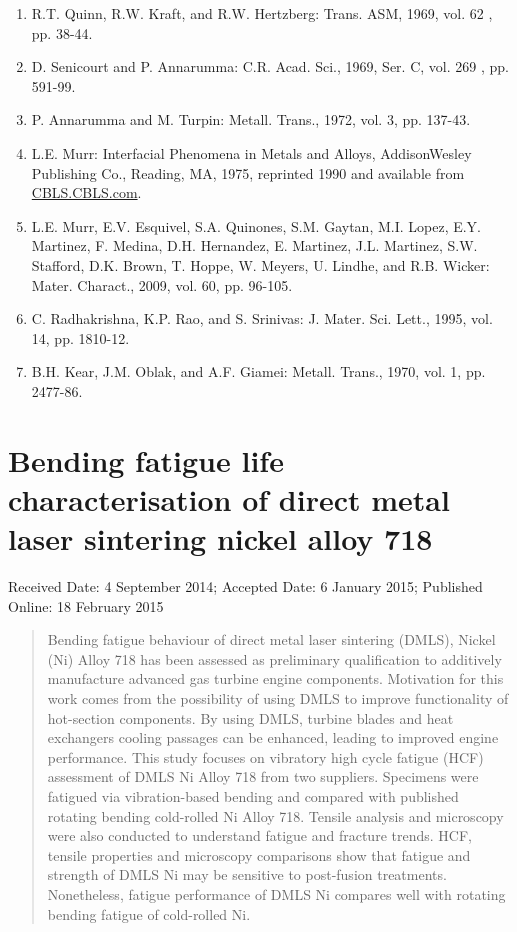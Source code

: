 \documentclass[10pt]{article}
\begin{document}
\begin{enumerate}
  \item R.T. Quinn, R.W. Kraft, and R.W. Hertzberg: Trans. ASM, 1969, vol. 62 , pp. 38-44.

  \item D. Senicourt and P. Annarumma: C.R. Acad. Sci., 1969, Ser. C, vol. 269 , pp. 591-99.

  \item P. Annarumma and M. Turpin: Metall. Trans., 1972, vol. 3, pp. 137-43.

  \item L.E. Murr: Interfacial Phenomena in Metals and Alloys, AddisonWesley Publishing Co., Reading, MA, 1975, reprinted 1990 and available from \href{http://CBLS.CBLS.com}{CBLS.CBLS.com}.

  \item L.E. Murr, E.V. Esquivel, S.A. Quinones, S.M. Gaytan, M.I. Lopez, E.Y. Martinez, F. Medina, D.H. Hernandez, E. Martinez, J.L. Martinez, S.W. Stafford, D.K. Brown, T. Hoppe, W. Meyers, U. Lindhe, and R.B. Wicker: Mater. Charact., 2009, vol. 60, pp. 96-105.

  \item C. Radhakrishna, K.P. Rao, and S. Srinivas: J. Mater. Sci. Lett., 1995, vol. 14, pp. 1810-12.

  \item B.H. Kear, J.M. Oblak, and A.F. Giamei: Metall. Trans., 1970, vol. 1, pp. 2477-86.

\end{enumerate}

\section*{Bending fatigue life characterisation of direct metal laser sintering nickel alloy 718 }
Received Date: 4 September 2014; Accepted Date: 6 January 2015; Published Online: 18 February 2015

\begin{abstract}
Bending fatigue behaviour of direct metal laser sintering (DMLS), Nickel (Ni) Alloy 718 has been assessed as preliminary qualification to additively manufacture advanced gas turbine engine components. Motivation for this work comes from the possibility of using DMLS to improve functionality of hot-section components. By using DMLS, turbine blades and heat exchangers cooling passages can be enhanced, leading to improved engine performance. This study focuses on vibratory high cycle fatigue (HCF) assessment of DMLS Ni Alloy 718 from two suppliers. Specimens were fatigued via vibration-based bending and compared with published rotating bending cold-rolled Ni Alloy 718. Tensile analysis and microscopy were also conducted to understand fatigue and fracture trends. HCF, tensile properties and microscopy comparisons show that fatigue and strength of DMLS Ni may be sensitive to post-fusion treatments. Nonetheless, fatigue performance of DMLS Ni compares well with rotating bending fatigue of cold-rolled Ni.
\end{abstract}
\end{document}
